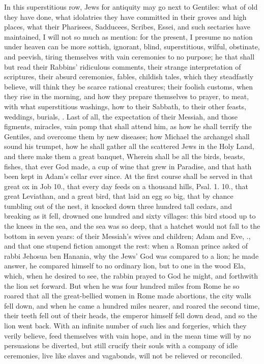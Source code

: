 {In this superstitious row, Jews for antiquity may go next to Gentiles:
what of old they have done, what idolatries they have committed in
their groves and high places, what their Pharisees, Sadducees, Scribes,
Essei, and such sectaries have maintained, I will not so much as
mention: for the present, I presume no nation under heaven can be more
sottish, ignorant, blind, superstitious, wilful, obstinate, and
peevish, tiring themselves with vain ceremonies to no purpose; he that
shall but read their Rabbins' ridiculous comments, their strange
interpretation of scriptures, their absurd ceremonies, fables, childish
tales, which they steadfastly believe, will think they be scarce
rational creatures; their foolish customs, when they rise in the
morning, and how they prepare themselves to prayer, to meat, with what
superstitious washings, how to their Sabbath, to their other feasts,
weddings, burials, \etc{}. Last of all, the expectation of their Messiah,
and those figments, miracles, vain pomp that shall attend him, as how
he shall terrify the Gentiles, and overcome them by new diseases; how
Michael the archangel shall sound his trumpet, how he shall gather all
the scattered Jews in the Holy Land, and there make them a great
banquet,  Wherein shall be all the birds, beasts, fishes, that
ever God made, a cup of wine that grew in Paradise, and that hath been
kept in Adam's cellar ever since. At the first course shall be served
in that great ox in Job  10., that every day feeds on a thousand
hills, Psal. 1. 10., that great Leviathan, and a great bird, that laid
an egg so big, that by chance tumbling out of the nest, it
knocked down three hundred tall cedars, and breaking as it fell,
drowned one hundred and sixty villages: this bird stood up to the knees
in the sea, and the sea was so deep, that a hatchet would not fall to
the bottom in seven years: of their Messiah's wives and children;
Adam and Eve, \etc{}., and that one stupend fiction amongst the rest: when
a Roman prince asked of rabbi Jehosua ben Hanania, why the Jews' God
was compared to a lion; he made answer, he compared himself to no
ordinary lion, but to one in the wood Ela, which, when he desired to
see, the rabbin prayed to God he might, and forthwith the lion set
forward.  But when he was four hundred miles from Rome he so
roared that all the great-bellied women in Rome made abortions, the
city walls fell down, and when he came a hundred miles nearer, and
roared the second time, their teeth fell out of their heads, the
emperor himself fell down dead, and so the lion went back. With an
infinite number of such lies and forgeries, which they verily believe,
feed themselves with vain hope, and in the mean time will by no
persuasions be diverted, but still crucify their souls with a company
of idle ceremonies, live like slaves and vagabonds, will not be
relieved or reconciled.

}

